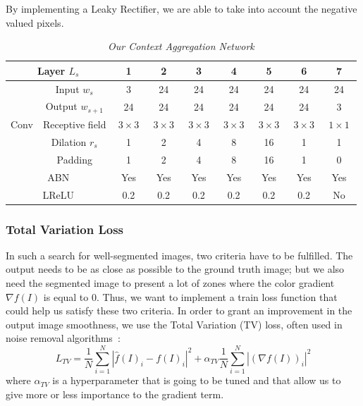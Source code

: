 \documentclass{article}
\begin{document}
            \noindent By implementing a Leaky Rectifier, we are able to take into account the negative valued pixels.

            \begin{table}[!ht]
                \centering
                \begin{tabular}{|c|c||c|cccc|cc|}
                    \hline
                    \multicolumn{2}{|c||}{Layer $L_s$} & 1 & 2 & 3 & 4 & 5 & 6 & 7 \\
                    \hline
                    \hline
                     & Input $w_s$ & 3 & 24 & 24 & 24 & 24 & 24 & 24 \\
                     & Output $w_{s+1}$ & 24 & 24 & 24 & 24 & 24 & 24 & 3 \\
                    \cline{2-9}
                    Conv & Receptive field & $\ 3\times 3\ $ & $\ 3\times 3\ $ & $\ 3\times 3\ $ & $\ 3\times 3\ $ & $\ 3\times 3\ $ & $\ 3\times 3\ $ & $\ 1\times 1\ $ \\
                     & Dilation $r_s$ & 1 & 2 & 4 & 8 & 16 & 1 & 1 \\
                     & Padding & 1 & 2 & 4 & 8 & 16 & 1 & 0 \\
                    \hline
                    \multicolumn{2}{|c||}{ABN} & Yes & Yes & Yes & Yes & Yes & Yes & Yes \\
                    \hline
                    \multicolumn{2}{|c||}{LReLU} & 0.2 & 0.2 & 0.2 & 0.2 & 0.2 & 0.2 & No \\
                    \hline
                \end{tabular}
                \caption{\textit{Our Context Aggregation Network}}
            \end{table}

\newpage
        \subsubsection{Total Variation Loss}
            In such a search for well-segmented images, two criteria have to be fulfilled. The output needs to be as close as possible to the ground truth image; but we also need the segmented image to present a lot of zones where the color gradient $\nabla f(I)$ is equal to $0$. Thus, we want to implement a train loss function that could help us satisfy these two criteria.
            In order to grant an improvement in the output image smoothness, we use the Total Variation (TV) loss, often used in noise removal algorithms~\cite{rudin1992,chambolle2004}:
            $$
            L_{TV}=\frac{1}{N}\sum_{i=1}^N |\hat{f}(I)_i-f(I)_i|^2+\alpha_{TV}\frac{1}{N}\sum_{i=1}^N|(\nabla f(I))_i|^2
            $$
            where $\alpha_{TV}$ is a hyperparameter that is going to be tuned and that allow us to give more or less importance to the gradient term.
\end{document}

